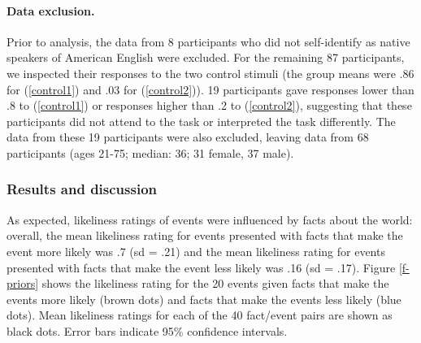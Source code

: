 \documentclass[11pt,fleqn]{article}
\newcommand{\6}{\mbox{$[\hspace*{-.6mm}[$}}
\newcommand{\9}{\mbox{$]\hspace*{-.6mm}]$}}
\begin{document}
\paragraph{Data exclusion.}
Prior to analysis, the data from 8 participants who did not self-identify as native speakers of American English were excluded. For the remaining 87 participants, we inspected their responses to the two control stimuli (the group means were .86 for (\ref{control1}) and .03 for (\ref{control2})). 19 participants gave responses lower than .8 to (\ref{control1}) or responses higher than .2 to (\ref{control2}), suggesting that these participants did not attend to the task or interpreted the task differently. The data from these 19 participants were also excluded, leaving data from 68 participants (ages 21-75; median: 36; 31 female, 37 male).  

\subsubsection{Results and discussion}

As expected, likeliness ratings of events were influenced by facts about the world: overall, the mean likeliness rating for events presented with facts that make the event more likely was .7 (sd = .21) and the mean likeliness rating for events presented with facts that make the event less likely was .16 (sd = .17). Figure \ref{f-priors} shows the likeliness rating for the 20 events given facts that make the events more likely (brown dots) and facts that make the events less likely (blue dots). Mean likeliness ratings for each of the 40 fact/event pairs are shown as black dots. Error bars indicate 95\% confidence intervals.
\end{document}
